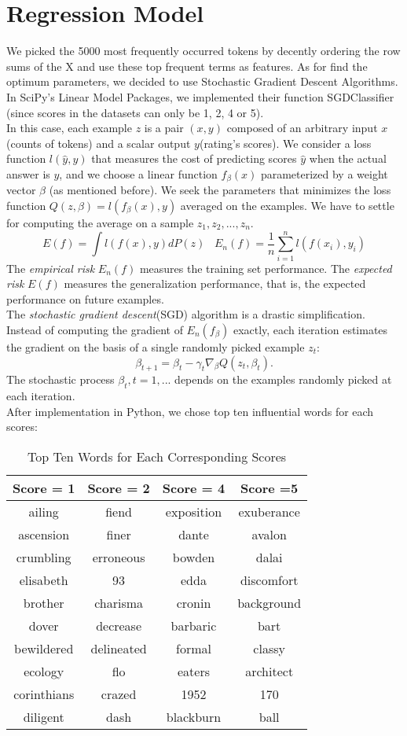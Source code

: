 \documentclass[paper=a4, fontsize=11pt]{scrartcl} %
\numberwithin{equation}{section} %
\numberwithin{figure}{section} %
\numberwithin{table}{section} %
\begin{document}
\section{Regression Model}
We picked the 5000 most frequently occurred tokens by decently ordering the row sums of the X and use these top frequent terms as features. As for find the optimum parameters, we decided to use Stochastic Gradient Descent Algorithms. In SciPy's Linear Model Packages, we implemented their function SGDClassifier (since scores in the datasets can only be 1, 2, 4 or 5).\\
In this case, each example \(z\) is a pair \((x,y)\) composed of an arbitrary input \(x\)(counts of tokens) and a scalar output \(y\)(rating's scores). We consider a loss function \(l(\hat{y},y)\) that measures the cost of predicting scores \(\hat{y}\) when the actual answer is \(y\), and we choose a linear function \(f_{\beta}(x)\) parameterized by a weight vector \(\beta\) (as mentioned before). We seek the parameters that minimizes the loss function \(Q(z,\beta) = l(f_{\beta}(x),y)\) averaged on the examples. We have to settle for computing the average on a sample \(z_{1},z_{2},...,z_{n}\).
\[E(f) = \int l(f(x),y)dP(z)\;\;\;E_{n}(f) = \frac{1}{n}\sum_{i=1}^{n} l(f(x_i),y_i)\]
The \textsl{empirical risk} \(E_n(f)\) measures the training set performance. The \textsl{expected risk} \(E(f)\) measures the generalization performance, that is, the expected performance on future examples.\\
The \textsl{stochastic gradient descent}(SGD) algorithm is a drastic simplification. Instead of computing the gradient of \(E_{n}(f_{\beta})\) exactly, each iteration estimates the gradient on the basis of a single randomly picked example \(z_t\):
\[\beta_{t+1} = \beta_{t}  - \gamma_{t}\nabla_{\beta}Q(z_t,\beta_t).\]
The stochastic process \({\beta_t,t=1,...}\) depends on the examples randomly picked at each iteration. \\
After implementation in Python, we chose top ten influential words for each scores:
\begin{table}[ht]
\caption{Top Ten Words for Each Corresponding Scores}
\centering
\begin{tabular}{c c c c}
\hline\hline
Score = 1 & Score = 2 & Score = 4 & Score  =5 \\ [0.5ex] %
\hline
ailing&fiend&exposition&exuberance \\
ascension&finer&dante&avalon \\
crumbling&erroneous&bowden &dalai \\
elisabeth & 93 & edda & discomfort \\
brother & charisma & cronin & background \\ 
dover & decrease & barbaric & bart \\
bewildered & delineated & formal & classy \\
ecology & flo & eaters & architect \\
corinthians & crazed & 1952 & 170 \\
diligent &dash & blackburn & ball\\[1ex]
\hline
\end{tabular}
\label{table:nonlin}
\end{table}
\end{document}
